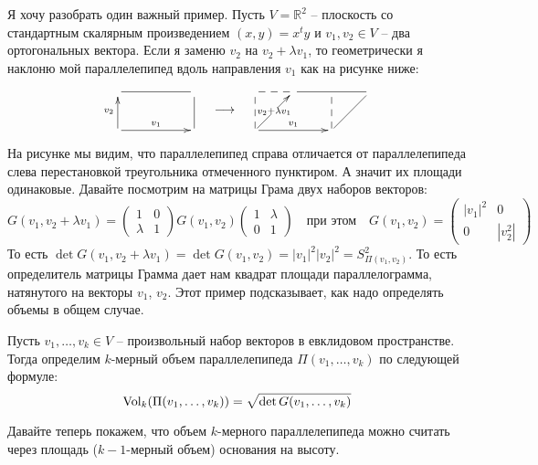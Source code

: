 Я хочу разобрать один важный пример.
Пусть $V = \mathbb R^2$ -- плоскость со стандартным скалярным произведением $(x, y) = x^t y$ и $v_1,v_2\in V$ -- два ортогональных вектора.
Если я заменю $v_2$ на $v_2 + \lambda v_1$, то геометрически я наклоню мой параллелепипед вдоль направления $v_1$ как на рисунке ниже:
\[
\begin{aligned}
\xymatrix{
	{}\ar@{-}[rr]&{}&{}\\
	{}\ar[u]^{v_2}\ar[rr]^{v_1}&{}&{}\ar@{-}[u]\\
}
\end{aligned}
\quad\longrightarrow\quad
\begin{aligned}
\xymatrix{
	{}\ar@{--}[r]&{}\ar@{-}[rr]&{}&{}\\
	{}\ar@{--}[u]\ar[rr]^{v_1}\ar[ru]|{v_2 + \lambda v_1}&{}&{}\ar@{--}[u]\ar@{-}[ru]&{}\\
}
\end{aligned}
\]
На рисунке мы видим, что параллелепипед справа отличается от параллелепипеда слева перестановкой треугольника отмеченного пунктиром.
А значит их площади одинаковые.
Давайте посмотрим на матрицы Грама двух наборов векторов:
\[
G(v_1, v_2 + \lambda v_1) = 
\begin{pmatrix}
{1}&{0}\\
{\lambda}&{1}
\end{pmatrix}
G(v_1,v_2)
\begin{pmatrix}
{1}&{\lambda}\\
{0}&{1}
\end{pmatrix}
\quad\text{при этом}\quad
G(v_1,v_2) =
\begin{pmatrix}
{|v_1|^2}&{0}\\
{0}&{|v_2^2|}
\end{pmatrix}
\]
То есть $\det G(v_1,v_2 + \lambda v_1) = \det G(v_1,v_2) = |v_1|^2 |v_2|^2 = S_{\Pi(v_1,v_2)}^2$.
То есть определитель матрицы Грамма дает нам квадрат площади параллелограмма, натянутого на векторы $v_1$, $v_2$.
Этот пример подсказывает, как надо определять объемы в общем случае.

\begin{definition}
Пусть $v_1,\ldots, v_k\in V$ -- произвольный набор векторов в евклидовом пространстве.
Тогда определим $k$-мерный объем параллелепипеда $\Pi(v_1,\ldots,v_k)$ по следующей формуле:
\[
\operatorname{Vol}_k(\Pi(v_1,\ldots,v_k)) = \sqrt{\det G(v_1,\ldots,v_k)}
\]
\end{definition}

Давайте теперь покажем, что объем $k$-мерного параллелепипеда можно считать через площадь ($k-1$-мерный объем) основания на высоту.

